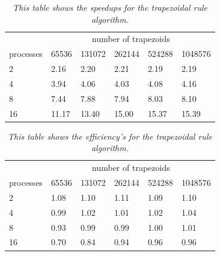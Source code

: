 \documentclass[a4paper,11pt,twoside]{article}
\begin{document}
\begin{table}[]
\centering
\caption{\textit{This table shows the speedups for the trapezoidal rule algorithm.}}
\label{tab:speedup_trap}
\begin{tabular}{llllll}
\multicolumn{1}{l|}{}          & \multicolumn{5}{c}{number of trapezoids}                                                                                       \\ \cline{2-6} 
\multicolumn{1}{l|}{processes} & \multicolumn{1}{l|}{65536} & \multicolumn{1}{l|}{131072} & \multicolumn{1}{l|}{262144} & \multicolumn{1}{l|}{524288} & 1048576 \\ \hline
2                              & 2.16                       & 2.20                        & 2.21                        & 2.19                        & 2.19    \\
4                              & 3.94                       & 4.06                        & 4.03                        & 4.08                        & 4.16    \\
8                              & 7.44                       & 7.88                        & 7.94                        & 8.03                        & 8.10    \\
16                             & 11.17                      & 13.40                       & 15.00                       & 15.37                       & 15.39  
\end{tabular}
\end{table}

\begin{table}[]
\centering
\caption{\textit{This table shows the efficiency's for the trapezoidal rule algorithm.}}
\label{tab:efficiencies_trap}
\begin{tabular}{llllll}
\multicolumn{1}{l|}{}          & \multicolumn{5}{c}{number of trapezoids}                                                                                       \\ \cline{2-6} 
\multicolumn{1}{l|}{processes} & \multicolumn{1}{l|}{65536} & \multicolumn{1}{l|}{131072} & \multicolumn{1}{l|}{262144} & \multicolumn{1}{l|}{524288} & 1048576 \\ \hline
2                              & 1.08                       & 1.10                        & 1.11                        & 1.09                        & 1.10    \\
4                              & 0.99                       & 1.02                        & 1.01                        & 1.02                        & 1.04    \\
8                              & 0.93                       & 0.99                        & 0.99                        & 1.00                        & 1.01    \\
16                             & 0.70                       & 0.84                        & 0.94                        & 0.96                        & 0.96   
\end{tabular}
\end{table}
\end{document}
